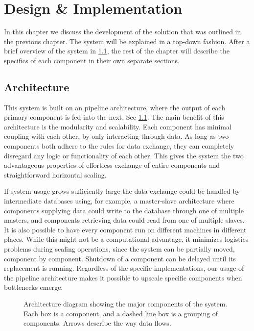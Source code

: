 \chapter{Design \& Implementation}\label{chap:design}
In this chapter we discuss the development of the solution that was outlined in the previous chapter. The system will be explained in a top-down fashion. After a brief overview of the system in \cref{sec:design_overview}, the rest of the chapter will describe the specifics of each component in their own separate sections.

\section{Architecture}\label{sec:design_overview}
This system is built on an pipeline architecture, where the output of each primary component is fed into the next. See \cref{fig:system-overview}. The main benefit of this architecture is the modularity and scalability. Each component has minimal coupling with each other, by only interacting through data. As long as two components both adhere to the rules for data exchange, they can completely disregard any logic or functionality of each other. This gives the system the two advantageous properties of effortless exchange of entire components and straightforward horizontal scaling.

If system usage grows sufficiently large the data exchange could be handled by intermediate databases using, for example, a master-slave architecture where components supplying data could write to the database through one of multiple masters, and components retrieving data could read from one of multiple slaves. It is also possible to have every component run on different machines in different places. While this might not be a computational advantage, it minimizes logistics problems during scaling operations, since the system can be partially moved, component by component. Shutdown of a component can be delayed until its replacement is running. Regardless of the specific implementations, our usage of the pipeline architecture makes it possible to upscale specific components when bottlenecks emerge.

\begin{figure}[tb]%
  \centering
  
\caption[Architecture diagram showing the major components of the system]{Architecture diagram showing the major components of the system. Each box is a component, and a dashed line box is a grouping of components. Arrows describe the way data flows.}%
\label{fig:system-overview}%
\end{figure}

